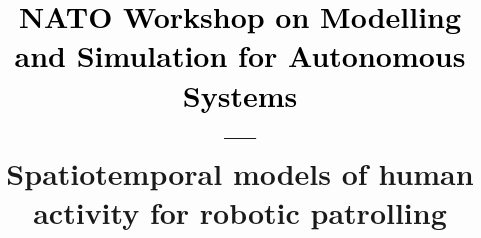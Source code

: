 \newcommand{\Subject}{\textcolor{black}{NATO Workshop on Modelling and Simulation for Autonomous Systems}\\{---}\\\LARGE{Spatiotemporal models of human activity for robotic patrolling}}
\newcommand{\Meeting}{MESAS 2018, Prague}
\newcommand{\Author}{Tom{\'a}{\v s} Vintr}
\newcommand{\Authors}{Tom{\'a}{\v s} Vintr, Kerem Eyisoy, Vanda Vintrov{\'a}, Tom{\'a}{\v s} Krajn{\'i}k}
\newcommand{\Date}{}

\newcommand{\video}[2]{\href{run:#1}{\texttt{[image: \#2]}}}
\newcommand{\link}[2]{\href{run:#1}{\texttt{[image: \#2]}}}
\newcommand{\bib}[3]{\begin{thebibliography}{#1}\bibitem[#1]{#1}{#2}.\newblock{\em #3}\end{thebibliography}}

\newcommand{\Lincoln}{Artificial Intelligence Center, Faculty of Electrical Engineering, Czech Technical University,\\Department of Computer Engineering, Faculty of Engineering, Marmara University,\\Faculty of Informatics and Statistics, University of Economics, Prague}
\newcommand{\Institute}{\Lincoln\\}


\newcommand{\HeadLineLeft}{Tom{\'a}{\v s} Vintr}
\newcommand{\HeadLineCenter}{NATO Workshop on Modelling and Simulation for Autonomous Systems}
\newcommand{\HeadLineRight}{AIC@CTU}
\newcommand{\FootLineCenter}{Spatiotemporal models of human activity for robotic patrolling}
\newcommand{\FootLineLeft}{\insertshortauthor}



\title{{\bf \Subject}}
\usepackage{multirow}


\frame{\titlepage}

